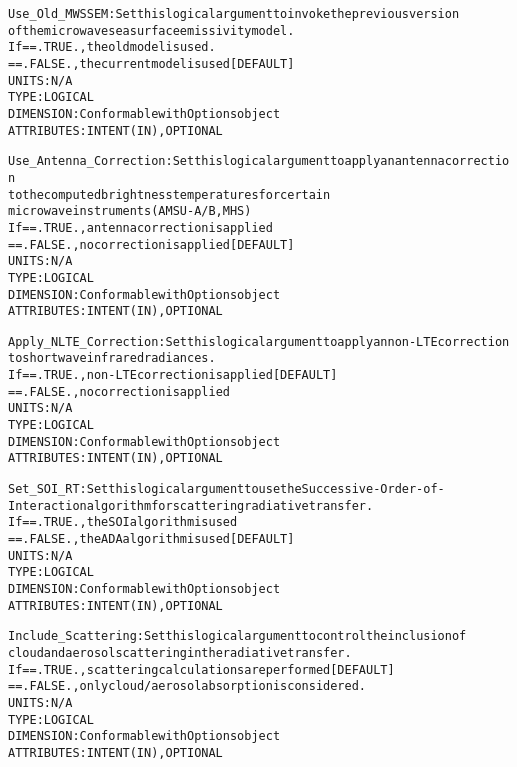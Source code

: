 \begin{alltt}
    Use_Old_MWSSEM:           Set this logical argument to invoke the previous version
                              of the microwave sea surface emissivity model.
                              If == .TRUE. , the old model is used.
                                 == .FALSE., the current model is used [DEFAULT]
                              UNITS:      N/A
                              TYPE:       LOGICAL
                              DIMENSION:  Conformable with Options object
                              ATTRIBUTES: INTENT(IN), OPTIONAL
               
    Use_Antenna_Correction:   Set this logical argument to apply an antenna correction
                              to the computed brightness temperatures for certain
                              microwave instruments (AMSU-A/B, MHS)
                              If == .TRUE. , antenna correction is applied
                                 == .FALSE., no correction is applied [DEFAULT]
                              UNITS:      N/A
                              TYPE:       LOGICAL
                              DIMENSION:  Conformable with Options object
                              ATTRIBUTES: INTENT(IN), OPTIONAL
                
    Apply_NLTE_Correction:    Set this logical argument to apply an non-LTE correction
                              to shortwave infrared radiances.
                              If == .TRUE. , non-LTE correction is applied [DEFAULT]
                                 == .FALSE., no correction is applied
                              UNITS:      N/A
                              TYPE:       LOGICAL
                              DIMENSION:  Conformable with Options object
                              ATTRIBUTES: INTENT(IN), OPTIONAL
                  
    Set_SOI_RT:               Set this logical argument to use the Successive-Order-of-
                              Interaction algorithm for scattering radiative transfer.
                              If == .TRUE. , the SOI algorithm is used
                                 == .FALSE., the ADA algorithm is used [DEFAULT]
                              UNITS:      N/A
                              TYPE:       LOGICAL
                              DIMENSION:  Conformable with Options object
                              ATTRIBUTES: INTENT(IN), OPTIONAL
                                 
    Include_Scattering:       Set this logical argument to control the inclusion of
                              cloud and aerosol scattering in the radiative transfer.
                              If == .TRUE. , scattering calculations are performed [DEFAULT]
                                 == .FALSE., only cloud/aerosol absorption is considered.
                              UNITS:      N/A
                              TYPE:       LOGICAL
                              DIMENSION:  Conformable with Options object
                              ATTRIBUTES: INTENT(IN), OPTIONAL
                           

\end{alltt}
